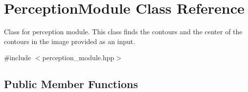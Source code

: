 \hypertarget{class_perception_module}{}\section{Perception\+Module Class Reference}
\label{class_perception_module}


Class for perception module. This class finds the contours and the center of the contours in the image provided as an input.  




{\ttfamily \#include $<$perception\+\_\+module.\+hpp$>$}

\subsection*{Public Member Functions}
